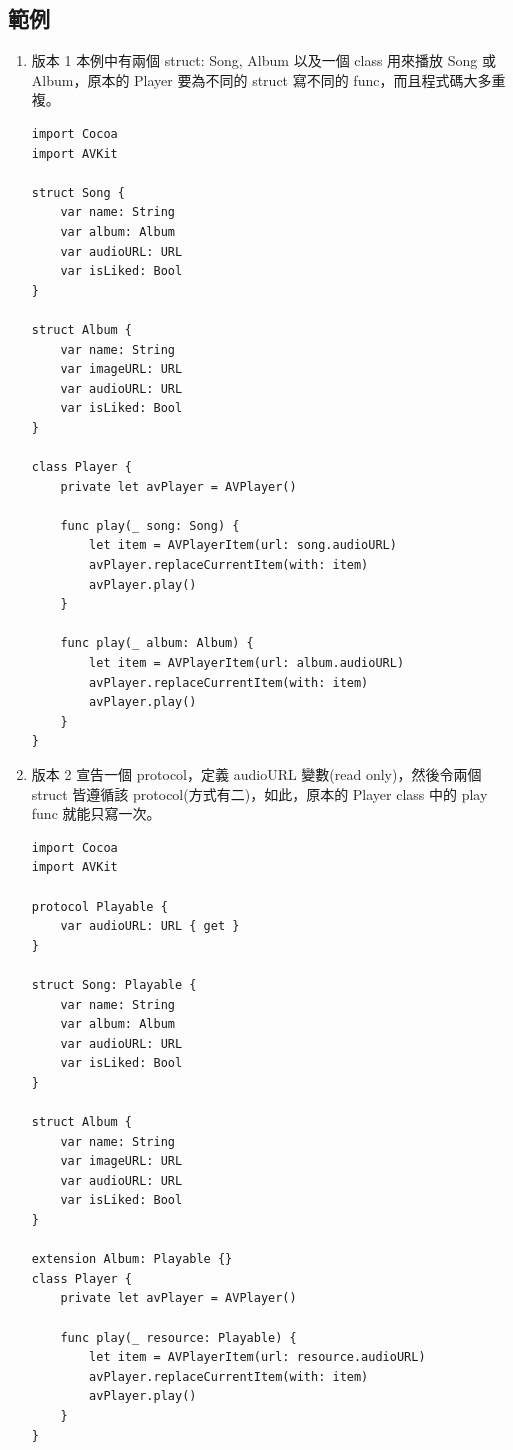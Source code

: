\documentclass[a4paper,12pt]{article}
\begin{document}
\subsection{範例}
\label{sec:org4e67f78}
\begin{enumerate}
\item 版本 1
\label{sec:orgebc97bc}
本例中有兩個 struct: Song, Album 以及一個 class 用來播放 Song 或 Album，原本的 Player 要為不同的 struct 寫不同的 func，而且程式碼大多重複。\\
\lstset{breaklines=true,language=swift,label= ,caption= ,captionpos=b,firstnumber=1,numbers=left}
\begin{lstlisting}
import Cocoa
import AVKit

struct Song {
    var name: String
    var album: Album
    var audioURL: URL
    var isLiked: Bool
}

struct Album {
    var name: String
    var imageURL: URL
    var audioURL: URL
    var isLiked: Bool
}

class Player {
    private let avPlayer = AVPlayer()

    func play(_ song: Song) {
        let item = AVPlayerItem(url: song.audioURL)
        avPlayer.replaceCurrentItem(with: item)
        avPlayer.play()
    }

    func play(_ album: Album) {
        let item = AVPlayerItem(url: album.audioURL)
        avPlayer.replaceCurrentItem(with: item)
        avPlayer.play()
    }
}
\end{lstlisting}

\item 版本 2
\label{sec:orga6c1aaa}
宣告一個 protocol，定義 audioURL 變數(read only)，然後令兩個 struct 皆遵循該 protocol(方式有二)，如此，原本的 Player class 中的 play func 就能只寫一次。\\
\lstset{breaklines=true,language=swift,label= ,caption= ,captionpos=b,firstnumber=1,numbers=left}
\begin{lstlisting}
import Cocoa
import AVKit

protocol Playable {
    var audioURL: URL { get }
}

struct Song: Playable {
    var name: String
    var album: Album
    var audioURL: URL
    var isLiked: Bool
}

struct Album {
    var name: String
    var imageURL: URL
    var audioURL: URL
    var isLiked: Bool
}

extension Album: Playable {}
class Player {
    private let avPlayer = AVPlayer()

    func play(_ resource: Playable) {
        let item = AVPlayerItem(url: resource.audioURL)
        avPlayer.replaceCurrentItem(with: item)
        avPlayer.play()
    }
}
\end{lstlisting}


\end{enumerate}
\end{document}
